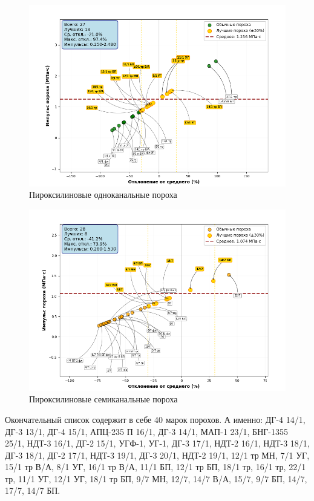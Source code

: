 \documentclass[14pt, a4paper]{extreport} %
\begin{document}
\begin{figure}[H]
\centering
\includegraphics[width=0.65\textheight]{imgs/kaif2.png}
\caption{Пироксилиновые одноканальные пороха}
\end{figure}

\begin{figure}[H]
\centering
\includegraphics[width=0.65\textheight]{imgs/kaif4.png}
\caption{Пироксилиновые семиканальные пороха}
\end{figure}

Окончательный список содержит в себе 40 марок порохов. А именно: ДГ-4 14/1, ДГ-3 13/1, ДГ-4 15/1, АПЦ-235 П 16/1, ДГ-3 14/1, МАП-1 23/1, БНГ-1355 25/1, НДТ-3 16/1, ДГ-2 15/1, УГФ-1, УГ-1, ДГ-3 17/1, НДТ-2 16/1, НДТ-3 18/1, ДГ-3 18/1, ДГ-2 17/1, НДТ-3 19/1, ДГ-3 20/1, НДТ-2 19/1, 12/1 тр МН, 7/1 УГ, 15/1 тр В/А, 8/1 УГ, 16/1 тр В/А, 11/1 БП, 12/1 тр БП, 18/1 тр, 16/1 тр, 22/1 тр, 11/1 УГ, 12/1 УГ, 18/1 тр БП, 9/7 МН, 12/7, 14/7 В/А, 15/7, 9/7 БП, 14/7, 17/7, 14/7 БП.
\end{document}
